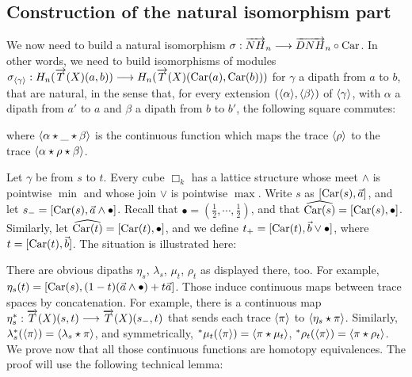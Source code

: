 


\subsection{Construction of the natural isomorphism part}
\label{subsec:natisopar}


We now need to build a natural isomorphism
  $\sigma : \overrightarrow{NH}_{n} \longrightarrow \overrightarrow{DNH}_n\circ\text{Car}$.  In other words, we need to build
  isomorphisms of modules $\sigma_{\langle\gamma\rangle} : H_n(\overrightarrow{T}(X)(a,b)) \longrightarrow H_n(\overrightarrow{T}(X)(\text{Car}(a),\text{Car}(b)))$ for $\gamma$ a dipath from $a$ to $b$, that are natural, in the sense that, for every extension $(\langle\alpha\rangle,\langle\beta\rangle)$ of $\langle\gamma\rangle$, with $\alpha$ a dipath from $a'$ to $a$ and $\beta$ a dipath from $b$ to $b'$, the following square commutes:
\begin{figure}[H]
  \centering
    		
\end{figure}
\noindent where $\langle\alpha\star\_\star\beta\rangle$ is the continuous function which maps the trace $\langle\rho\rangle$ to the trace $\langle\alpha\star\rho\star\beta\rangle$.

Let $\gamma$ be from $s$ to $t$. Every cube $\Box_k$ has a lattice structure whose meet $\wedge$ is
    pointwise $\min$ and whose join $\vee$ is pointwise $\max$.  Write
    $s$ as $[\text{Car}(s), \vec a]$, and let $s_- = [\text{Car}(s),
    \vec a \wedge \bullet]$.  Recall that $\bullet = (\frac 1 2,
    \cdots, \frac 1 2)$, and that $\widehat {\text{Car}(s)} =
    [\text{Car}(s), \bullet]$.  Similarly, let $\widehat {\text{Car}
      (t)} = [\text{Car}(t), \bullet]$, and we define $t_+ =
    [\text{Car}(t), \vec b \vee \bullet]$, where $t = [\text{Car}(t), \vec b]$.  The situation is illustrated here:
    \begin{figure}[H]
  \centering
    		
\end{figure}
    

    There are obvious dipaths $\eta_s$, $\lambda_s$, $\mu_t$, $\rho_t$
    as displayed there, too. For example, $\eta_s (t) = [\text{Car}(s), (1-t) (\vec a
\wedge \bullet) + t \vec a]$. Those induce continuous maps between
    trace spaces by concatenation. For example, there is a continuous map
$\eta_s^* : \overrightarrow{T}(X)(s,t) \longrightarrow \overrightarrow{T}(X)(s_-,t)$ that sends each
trace $\langle\pi\rangle$ to $\langle\eta_s\star\pi\rangle$.
Similarly, $\lambda_s^* (\langle\pi\rangle) = \langle\lambda_s
\star \pi\rangle$, and symmetrically, ${^*\mu_t} (\langle\pi\rangle) = \langle\pi \star \mu_t\rangle$, ${^*\rho_t} (\langle\pi\rangle) = \langle\pi \star \rho_t\rangle$. We prove now that all those continuous functions are homotopy equivalences. The proof will use the following technical lemma:

